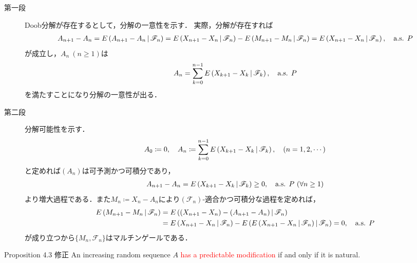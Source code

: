 	\begin{prf}\mbox{}
		\begin{description}
			\item[第一段]
				Doob分解が存在するとして，分解の一意性を示す．
				実際，分解が存在すれば
				\begin{align}
					A_{n+1} - A_n = E\left( A_{n+1}-A_n \, \middle|\, \mathscr{F}_{n} \right)
					= E\left( X_{n+1}-X_n \, \middle|\, \mathscr{F}_{n} \right) - E\left( M_{n+1}-M_n \, \middle|\, \mathscr{F}_{n} \right)
					= E\left( X_{n+1}-X_n \, \middle|\, \mathscr{F}_{n} \right),
					\quad \mbox{a.s. $P$}
				\end{align}
				が成立し，$A_n\ (n \geq 1)$は
				\begin{align}
					A_n = \sum_{k=0}^{n-1} E\left( X_{k+1}-X_k \, \middle|\, \mathscr{F}_{k} \right),
					\quad \mbox{a.s. $P$}
				\end{align}
				を満たすことになり分解の一意性が出る．
				
			\item[第二段]
				分解可能性を示す．
				\begin{align}
					A_0 \coloneqq 0,
					\quad A_n \coloneqq \sum_{k=0}^{n-1} E\left( X_{k+1}-X_k \, \middle|\, \mathscr{F}_{k} \right),
					\quad (n=1,2,\cdots)
				\end{align}
				と定めれば$(A_n)$は可予測かつ可積分であり，
				\begin{align}
					A_{n+1} - A_n = E\left( X_{k+1}-X_k \, \middle|\, \mathscr{F}_{k} \right) \geq 0,
					\quad \mbox{a.s. $P$}
					\ (\forall n \geq 1)
				\end{align}
				より増大過程である．また$M_n \coloneqq X_n - A_n$により$(\mathscr{F}_n)$-適合かつ可積分な過程を定めれば，
				\begin{align}
					E\left( M_{n+1} - M_n \, \middle|\, \mathscr{F}_n \right)
					&= E\left( (X_{n+1} - X_n)-(A_{n+1}-A_n) \, \middle|\, \mathscr{F}_n \right) \\
					&= E\left( X_{n+1} - X_n \, \middle|\, \mathscr{F}_n \right) - E\left( E\left( X_{n+1} - X_n \, \middle|\, \mathscr{F}_n \right) \, \middle|\, \mathscr{F}_n \right)
					= 0,
					\quad \mbox{a.s. $P$}
				\end{align}
				が成り立つから$\{M_n,\mathscr{F}_n\}$はマルチンゲールである．
				\QED
		\end{description}
	\end{prf}
	
	\begin{itembox}[l]{Proposition 4.3 修正}
		An increasing random sequence $A$ \textcolor{red}{has a predictable modification}
		if and only if it is natural.
	\end{itembox}
	
